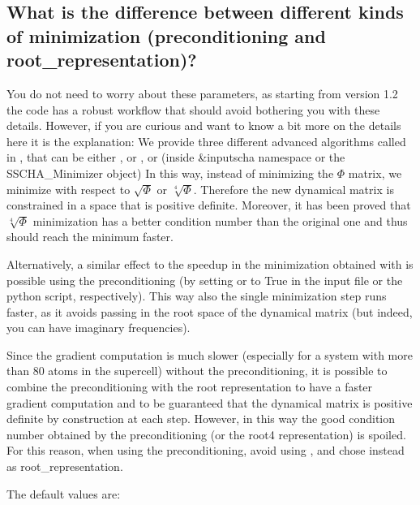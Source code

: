 \documentclass[a4paper,11pt,english]{sphinxmanual}
\begin{document}
\subsection{What is the difference between different kinds of minimization (preconditioning and root\_representation)?}
\label{\detokenize{faq:what-is-the-difference-between-different-kinds-of-minimization-preconditioning-and-root-representation}}
\sphinxAtStartPar
You do not need to worry about these parameters, as starting from version 1.2 the code has a robust workflow that should avoid bothering you with these details.
However, if you are curious and want to know a bit more on the details here it is the explanation:
We provide three different advanced algorithms called in , that can be either , or , or  (inside \&inputscha namespace or the SSCHA\_Minimizer object)
In this way, instead of minimizing the \(\Phi\) matrix, we minimize with respect to \(\sqrt{\Phi}\) or \(\sqrt[4]{\Phi}\).
Therefore the new dynamical matrix is constrained in a space that is positive definite. Moreover, it has been proved that \(\sqrt[4]{\Phi}\)
minimization has a better condition number than the original one and thus should reach the minimum faster.

\sphinxAtStartPar
Alternatively, a similar effect to the speedup in the minimization obtained with  is possible using the preconditioning (by setting  or  to True in the input file or the python script, respectively). This way also the single minimization step runs faster, as it avoids passing in the root space of the dynamical matrix (but indeed, you can have imaginary frequencies).

\sphinxAtStartPar
Since the gradient computation is much slower (especially for a system with more than 80 atoms in the supercell) without the preconditioning,
it is possible to combine the preconditioning with the root representation to have a faster gradient computation and to be guaranteed that
the dynamical matrix is positive definite by construction at each step.
However, in this way the good condition number obtained by the preconditioning (or the root4 representation) is spoiled. For this reason, when using the preconditioning, avoid using , and chose instead  as root\_representation.

\sphinxAtStartPar
The default values are:
\end{document}
